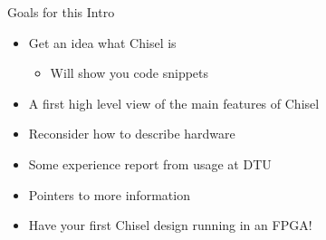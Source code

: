 \begin{frame}[fragile]{Goals for this Intro}
\begin{itemize}
\item Get an idea what Chisel is
\begin{itemize}
\item Will show you code snippets
\end{itemize}
\item A first high level view of the main features of Chisel
\item Reconsider how to describe hardware
\item Some experience report from usage at DTU
\item Pointers to more information
\item Have your first Chisel design running in an FPGA!
\end{itemize}
\end{frame}

%
%
%
%

